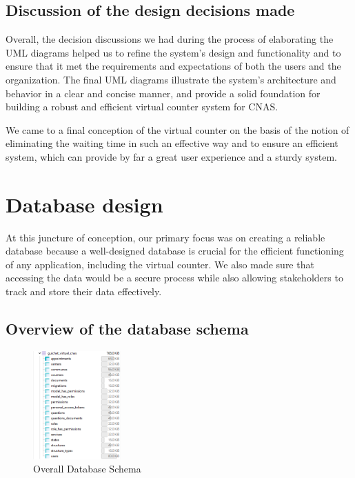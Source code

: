 \subsection{Discussion of the design decisions made}
Overall, the decision discussions we had during the process of elaborating the UML diagrams helped us to refine the system's design and functionality and to ensure that it met the requirements and expectations of both the users and the organization. The final UML diagrams illustrate the system's architecture and behavior in a clear and concise manner, and provide a solid foundation for building a robust and efficient virtual counter system for CNAS.

\medskip We came to a final conception of the virtual counter on the basis of the notion of eliminating the waiting time in such an effective way and to ensure an efficient system, which can provide by far a great user experience and a sturdy system. 
\newpage
\section{Database design}
At this juncture of conception, our primary focus was on creating a reliable database because a well-designed database is crucial for the efficient functioning of any application, including the virtual counter. We also made sure that accessing the data would be a secure process while also allowing stakeholders to track and store their data effectively.

\subsection{Overview of the database schema}
\begin{figure}[H]
    \centering
    \includegraphics*[width=0.3\textwidth]{SCREENSHOTS/overall.png}
    \caption{Overall Database Schema}
    \label{fig:overall-database-schema}
\end{figure}

